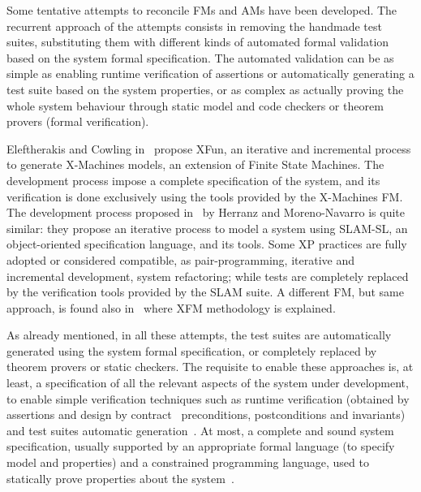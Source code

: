 \documentclass{article}
\begin{document}
Some tentative attempts to reconcile FMs and AMs have been developed.
The recurrent approach of the attempts consists in removing the handmade test suites, substituting them with different kinds of automated formal validation based on the system formal specification. 
The automated validation can be as simple as enabling runtime verification of assertions or automatically generating a test suite based on the system properties, or as complex as actually proving the whole system behaviour through static model and code checkers or theorem provers (formal verification).

Eleftherakis and Cowling in~\cite{Eleftherakis2003} propose XFun, an iterative and incremental process to generate X-Machines models, an extension of Finite State Machines. 
The development process impose a complete specification of the system, and its verification is done exclusively using the tools provided by the X-Machines FM. 
The development process proposed in~\cite{Herranz2003b} by Herranz and Moreno-Navarro is quite similar: they propose an iterative process to model a system using SLAM-SL, an object-oriented specification language, and its tools. 
Some XP practices are fully adopted or considered compatible, as pair-programming, iterative and incremental development, system refactoring; while tests are completely replaced by the verification tools provided by the SLAM suite.
A different FM, but same approach, is found also in~\cite{Suhaib2005} where XFM methodology is explained.

As already mentioned, in all these attempts, the test suites are automatically generated using the system formal specification, or completely replaced by theorem provers or static checkers. 
The requisite to enable these approaches is, at least, a specification of all the relevant aspects of the system under development, to enable simple verification techniques such as runtime verification (obtained by assertions and design by contract~\cite{Meyer1997} preconditions, postconditions and invariants) and test suites automatic generation~\cite{Cheon2002,Cheon2004,Cheon2005}.
At most, a complete and sound system specification, usually supported by an appropriate formal language (to specify model and properties) and a constrained programming language, used to statically prove properties about the system~\cite{CatanoHuisman02,DetlefsNelsonSaxe2005,KiniryCok04}.
\end{document}
